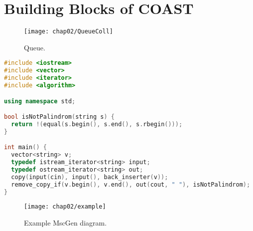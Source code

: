 \chapter{Building Blocks of COAST}\label{BuildingBlocks}

\begin{figure}[hbt]
  \centering
  \texttt{[image: chap02/QueueColl]}
  \caption{Queue.}
  \label{fig:queue}
\end{figure}

\begin{lstlisting}[language=C++, caption=Example Source]
#include <iostream>
#include <vector>
#include <iterator>
#include <algorithm>

using namespace std;

bool isNotPalindrom(string s) {
  return !(equal(s.begin(), s.end(), s.rbegin()));
}

int main() {
  vector<string> v;
  typedef istream_iterator<string> input;
  typedef ostream_iterator<string> out;
  copy(input(cin), input(), back_inserter(v));
  remove_copy_if(v.begin(), v.end(), out(cout, " "), isNotPalindrom);
}
\end{lstlisting}

\begin{figure}[hbt]
  \centering
  \texttt{[image: chap02/example]}
  \caption{Example MscGen diagram.}
  \label{fig:queue}
\end{figure}
